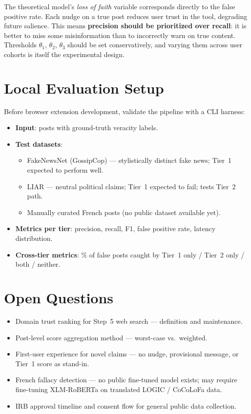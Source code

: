 The theoretical model's \textit{loss of faith} variable corresponds directly to the false positive rate.
Each nudge on a true post reduces user trust in the tool, degrading future salience.
This means \textbf{precision should be prioritized over recall}: it is better to miss some misinformation than to incorrectly warn on true content.
Thresholds $\theta_1$, $\theta_2$, $\theta_3$ should be set conservatively, and varying them across user cohorts is itself the experimental design.

\section{Local Evaluation Setup}

Before browser extension development, validate the pipeline with a CLI harness:

\begin{itemize}
  \item \textbf{Input}: posts with ground-truth veracity labels.
  \item \textbf{Test datasets}:
    \begin{itemize}
      \item FakeNewsNet (GossipCop) --- stylistically distinct fake news; Tier~1 expected to perform well.
      \item LIAR --- neutral political claims; Tier~1 expected to fail; tests Tier~2 path.
      \item Manually curated French posts (no public dataset available yet).
    \end{itemize}
  \item \textbf{Metrics per tier}: precision, recall, F1, false positive rate, latency distribution.
  \item \textbf{Cross-tier metrics}: \% of false posts caught by Tier~1 only / Tier~2 only / both / neither.
\end{itemize}

\section{Open Questions}

\begin{itemize}
  \item Domain trust ranking for Step~5 web search --- definition and maintenance.
  \item Post-level score aggregation method --- worst-case vs.\ weighted.
  \item First-user experience for novel claims --- no nudge, provisional message, or Tier~1 score as stand-in.
  \item French fallacy detection --- no public fine-tuned model exists; may require fine-tuning XLM-RoBERTa on translated LOGIC / CoCoLoFa data.
  \item IRB approval timeline and consent flow for general public data collection.
\end{itemize}
